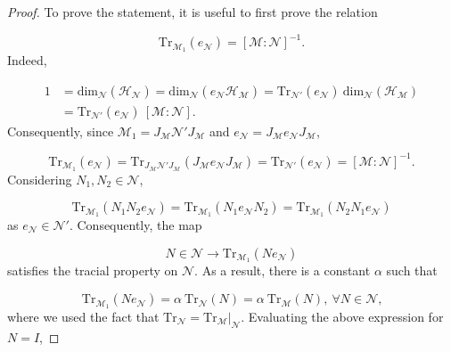\documentclass[a4paper,11pt]{article}
\begin{document}
\begin{proof}
    To prove the statement, it is useful to first prove the relation

    \begin{equation}
        \mathrm{Tr}_{\mathcal{M}_1}(e_{\mathcal{N}}) = [\mathcal{M} : \mathcal{N}]^{-1} \text{.}
    \end{equation}
    Indeed,

    \begin{equation}
        \begin{split}
            1 &= \mathrm{dim}_{\mathcal{N}}(\mathcal{H}_{\mathcal{N}}) = \mathrm{dim}_{\mathcal{N}}(e_{\mathcal{N}} \mathcal{H}_{\mathcal{M}}) = \mathrm{Tr}_{\mathcal{N}'}(e_{\mathcal{N}}) \ \mathrm{dim}_{\mathcal{N}}(\mathcal{H}_{\mathcal{M}}) \\
            &= \mathrm{Tr}_{\mathcal{N}'}(e_{\mathcal{N}}) \ [\mathcal{M} : \mathcal{N}] \text{.}
        \end{split}
    \end{equation}
    Consequently, since $\mathcal{M}_1 = J_{\mathcal{M}} \mathcal{N}' J_{\mathcal{M}}$ and $e_{\mathcal{N}} = J_{\mathcal{M}} e_{\mathcal{N}} J_{\mathcal{M}}$,

    \begin{equation}
        \mathrm{Tr}_{\mathcal{M}_1}(e_{\mathcal{N}}) = \mathrm{Tr}_{J_{\mathcal{M}} \mathcal{N}' J_{\mathcal{M}}} (J_{\mathcal{M}} e_{\mathcal{N}} J_{\mathcal{M}}) = \mathrm{Tr}_{\mathcal{N}'} (e_{\mathcal{N}}) = [\mathcal{M} : \mathcal{N}]^{-1} \text{.}
    \end{equation}
    Considering $N_1, N_2 \in \mathcal{N}$,

    \begin{equation}
        \mathrm{Tr}_{\mathcal{M}_1}(N_1 N_2 e_{\mathcal{N}}) = \mathrm{Tr}_{\mathcal{M}_1}(N_1 e_{\mathcal{N}} N_2) = \mathrm{Tr}_{\mathcal{M}_1}(N_2 N_1 e_{\mathcal{N}})
    \end{equation}
    as $e_{\mathcal{N}} \in \mathcal{N}'$. Consequently, the map

    \begin{equation}
        N \in \mathcal{N} \rightarrow \mathrm{Tr}_{\mathcal{M}_1}(N e_{\mathcal{N}})
    \end{equation}
    satisfies the tracial property on $\mathcal{N}$. As a result, there is a constant $\alpha$ such that

    \begin{equation}
        \mathrm{Tr}_{\mathcal{M}_1} (N e_{\mathcal{N}}) = \alpha  \ \mathrm{Tr}_{\mathcal{N}}(N) = \alpha  \ \mathrm{Tr}_{\mathcal{M}}(N), \ \forall N \in \mathcal{N} \text{,}
    \end{equation}
    where we used the fact that $\mathrm{Tr}_{\mathcal{N}} = \left. \mathrm{Tr}_{\mathcal{M}} \right|_{\mathcal{N}}$. Evaluating the above expression for $N = I$,


\end{proof}
\end{document}

